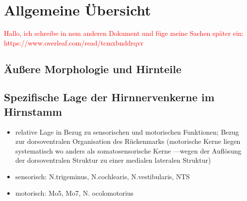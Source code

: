 \documentclass[12pt,a4paper,pdftex]{article}
\begin{document}
\newpage
\section{Allgemeine Übersicht}
\textcolor{red}{Hallo, ich schreibe in nem anderen Dokument und füge meine Sachen später ein: \\
\noindent https://www.overleaf.com/read/tcmxbnddrqvr}

\subsection{Äußere Morphologie und Hirnteile}
\subsection{Spezifische Lage der Hirnnervenkerne im Hirnstamm}
\begin{itemize}
    \item relative Lage in Bezug zu sensorischen und motorischen Funktionen; Bezug zur dorsoventralen Organisation des Rückenmarks  
    (motorische Kerne liegen systematisch wo anders als somatosensorische Kerne ---wegen der Auflösung der dorsoventralen Struktur zu einer medialen lateralen Struktur) 
    \item sensorisch: N.trigeminus, N.cochlearis, N.vestibularis, NTS
    \item motorisch: Mo5, Mo7, N. ocolomotorius
\end{itemize}

\newpage
\end{document}
